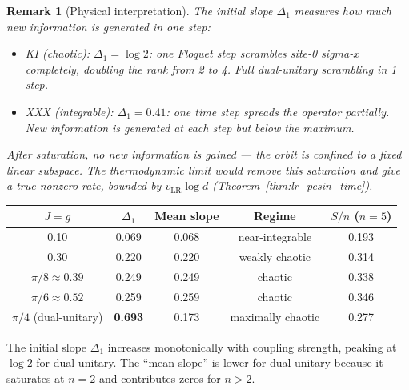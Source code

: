 \documentclass[12pt,a4paper]{article}
\newtheorem{remark}[theorem]{Remark}
\begin{document}
\begin{remark}[Physical interpretation]\label{rmk:chaos_diag_interp}
The initial slope $\Delta_1$ measures how much new information is generated in one step:
\begin{itemize}
\item KI (chaotic): $\Delta_1=\log 2$: one Floquet step scrambles site-0 sigma-$x$
  completely, doubling the rank from 2 to 4.  Full dual-unitary scrambling in 1 step.
\item XXX (integrable): $\Delta_1=0.41$: one time step spreads the operator partially.
  New information is generated at each step but below the maximum.
\end{itemize}
After saturation, no new information is gained — the orbit is confined to a fixed
linear subspace.  The thermodynamic limit would remove this saturation and give a
true nonzero rate, bounded by $v_\mathrm{LR}\log d$ (Theorem~\ref{thm:lr_pesin_time}).
\end{remark}

\begin{center}
\begin{tabular}{@{}ccccc@{}}
\toprule
$J=g$ & $\Delta_1$ & Mean slope & Regime & $S/n$ ($n=5$) \\
\midrule
0.10 & 0.069 & 0.068 & near-integrable & 0.193 \\
0.30 & 0.220 & 0.220 & weakly chaotic & 0.314 \\
$\pi/8\approx0.39$ & 0.249 & 0.249 & chaotic & 0.338 \\
$\pi/6\approx0.52$ & 0.259 & 0.259 & chaotic & 0.346 \\
$\pi/4$ (dual-unitary) & \textbf{0.693} & 0.173 & maximally chaotic & 0.277 \\
\bottomrule
\end{tabular}
\end{center}

\vspace{4pt}\noindent
The initial slope $\Delta_1$ increases monotonically with coupling strength,
peaking at $\log 2$ for dual-unitary.  The ``mean slope'' is lower for dual-unitary
because it saturates at $n=2$ and contributes zeros for $n>2$.
\end{document}
